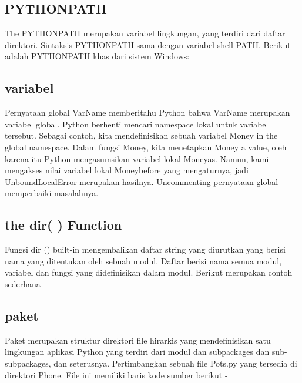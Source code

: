 \subsection{PYTHONPATH} 
The PYTHONPATH merupakan variabel lingkungan, yang terdiri dari daftar direktori. Sintaksis PYTHONPATH sama dengan variabel shell PATH. 
Berikut adalah PYTHONPATH khas dari sistem Windows:
 
\subsection{variabel}
Pernyataan global VarName memberitahu Python bahwa VarName merupakan variabel global. Python berhenti mencari namespace lokal untuk variabel tersebut. 
Sebagai contoh, kita mendefinisikan sebuah variabel Money in the global namespace. Dalam fungsi Money, kita menetapkan Money a value, oleh karena itu Python mengasumsikan variabel lokal Moneyas. Namun, kami mengakses nilai variabel lokal Moneybefore yang mengaturnya, jadi UnboundLocalError merupakan hasilnya. Uncommenting pernyataan global memperbaiki masalahnya.
 
\subsection{the dir( ) Function}
Fungsi dir () built-in mengembalikan daftar string yang diurutkan yang berisi nama yang ditentukan oleh sebuah modul.
Daftar berisi nama semua modul, variabel dan fungsi yang didefinisikan dalam modul. Berikut merupakan contoh sederhana - 



\subsection{paket}
Paket merupakan struktur direktori file hirarkis yang mendefinisikan satu lingkungan aplikasi Python yang terdiri dari modul dan subpackages dan sub-subpackages, dan seterusnya.
Pertimbangkan sebuah file Pots.py yang tersedia di direktori Phone. File ini memiliki baris kode sumber berikut -


